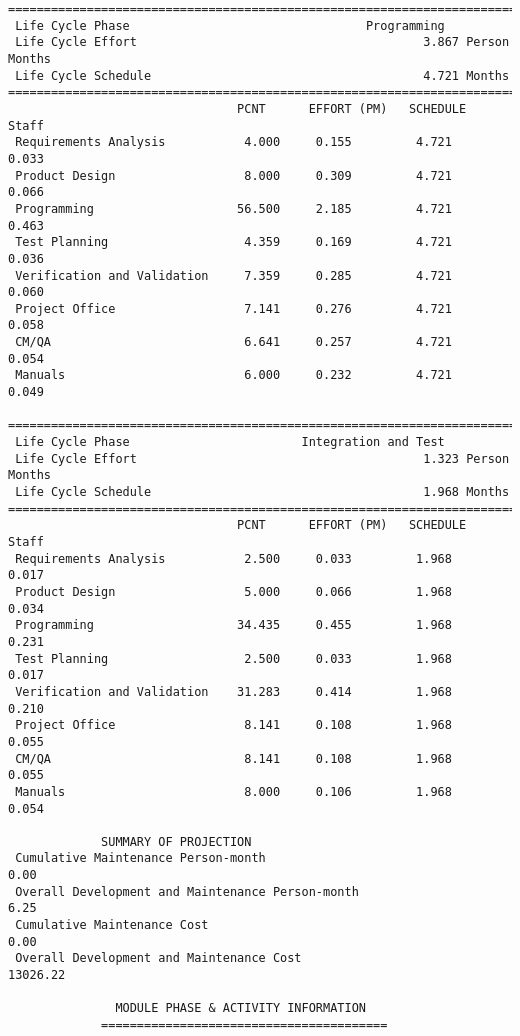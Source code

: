 \documentclass[11pt,a4paper,spanish,twoside]{report}
\begin{document}
{\begin{verbatim}
==============================================================================
 Life Cycle Phase                                 Programming
 Life Cycle Effort                                        3.867 Person Months
 Life Cycle Schedule                                      4.721 Months
==============================================================================
                                PCNT      EFFORT (PM)   SCHEDULE       Staff   
 Requirements Analysis           4.000     0.155         4.721        0.033
 Product Design                  8.000     0.309         4.721        0.066
 Programming                    56.500     2.185         4.721        0.463
 Test Planning                   4.359     0.169         4.721        0.036
 Verification and Validation     7.359     0.285         4.721        0.060
 Project Office                  7.141     0.276         4.721        0.058
 CM/QA                           6.641     0.257         4.721        0.054
 Manuals                         6.000     0.232         4.721        0.049

==============================================================================
 Life Cycle Phase                        Integration and Test
 Life Cycle Effort                                        1.323 Person Months
 Life Cycle Schedule                                      1.968 Months
==============================================================================
                                PCNT      EFFORT (PM)   SCHEDULE       Staff   
 Requirements Analysis           2.500     0.033         1.968        0.017
 Product Design                  5.000     0.066         1.968        0.034
 Programming                    34.435     0.455         1.968        0.231
 Test Planning                   2.500     0.033         1.968        0.017
 Verification and Validation    31.283     0.414         1.968        0.210
 Project Office                  8.141     0.108         1.968        0.055
 CM/QA                           8.141     0.108         1.968        0.055
 Manuals                         8.000     0.106         1.968        0.054

             SUMMARY OF PROJECTION
 Cumulative Maintenance Person-month                                 0.00
 Overall Development and Maintenance Person-month                    6.25
 Cumulative Maintenance Cost                                         0.00
 Overall Development and Maintenance Cost                        13026.22

		       MODULE PHASE & ACTIVITY INFORMATION
		     ========================================


\end{verbatim}}
\end{document}
